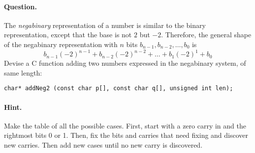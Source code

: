 \paragraph{Question.} The \emph{negabinary} representation of a number
is similar to the binary representation, except that the base is not
\(2\) but \(-2\). Therefore, the general shape of the negabinary
representation with \(n\) bits \(b_{n-1}, b_{n-2}, \dots, b_0\) is
\[
b_{n-1}(-2)^{n-1} + b_{n-2}(-2)^{n-2} + \dots + b_1(-2)^1 + b_0
\]
Devise a \textsf{C} function adding two numbers expressed in the
negabinary system, of same length:
{\small
\begin{verbatim}
char* addNeg2 (const char p[], const char q[], unsigned int len);
\end{verbatim}
}
\paragraph{Hint.} Make the table of all the possible cases. First,
start with a zero carry in and the rightmost bits 0 or 1. Then, fix
the bits and carries that need fixing and discover new carries. Then
add new cases until no new carry is discovered.
